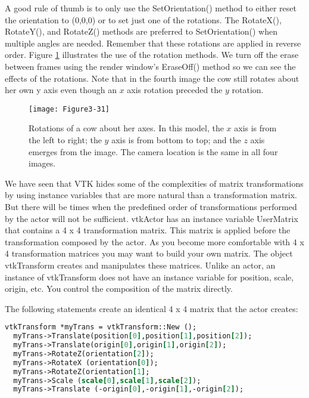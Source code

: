 A good rule of thumb is to only use the SetOrientation() method to either reset the orientation to (0,0,0) or to set just one of the rotations. The RotateX(), RotateY(), and RotateZ() methods are preferred to SetOrientation() when multiple angles are needed. Remember that these rotations are applied in reverse order. Figure \ref{fig:Figure3-31} illustrates the use of the rotation methods. We turn off the erase between frames using the render window's EraseOff() method so we can see the effects of the rotations. Note that in the fourth image the cow still rotates about her own y axis even though an $x$ axis rotation preceded the $y$ rotation.

\begin{figure}[!htb]
  \centering
  \texttt{[image: Figure3-31]}\\
  \caption{Rotations of a cow about her axes. In this model, the $x$ axis is from the left to right; the $y$ axis is from bottom to top; and the $z$ axis emerges from the image. The camera location is the same in all four images.}\label{fig:Figure3-31}
\end{figure}


We have seen that VTK hides some of the complexities of matrix transformations by using instance variables that are more natural than a transformation matrix. But there will be times when the predefined order of transformations performed by the actor will not be sufficient. vtkActor has an instance variable UserMatrix that contains a 4 x 4 transformation matrix. This matrix is applied before the transformation composed by the actor. As you become more comfortable with 4 x 4 transformation matrices you may want to build your own matrix. The object vtkTransform creates and manipulates these matrices. Unlike an actor, an instance of vtkTransform does not have an instance variable for position, scale, origin, etc. You control the composition of the matrix directly.

The following statements create an identical 4 x 4 matrix that the actor creates:

\begin{lstlisting}[language=TCL, caption={}]
vtkTransform *myTrans = vtkTransform::New ();
  myTrans->Translate(position[0],position[1],position[2]);
  myTrans->Translate(origin[0],origin[1],origin[2]);
  myTrans->RotateZ(orientation[2]);
  myTrans->RotateX (orientation[0]);
  myTrans->RotateZ(orientation[1];
  myTrans->Scale (scale[0],scale[1],scale[2]);
  myTrans->Translate (-origin[0],-origin[1],-origin[2]);
\end{lstlisting}

